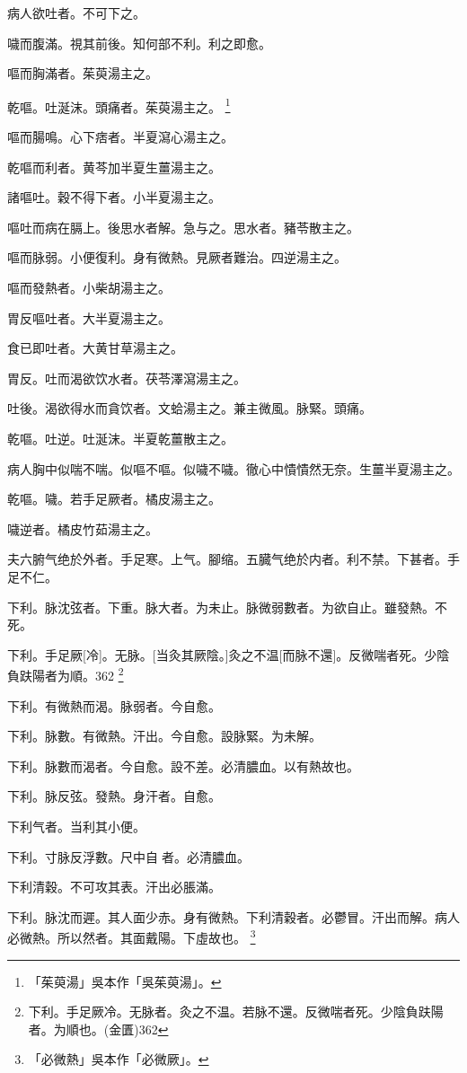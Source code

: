 \documentclass[oneside,b4paper]{ctexbook}
\begin{document}
\begin{flushleft}
病人欲吐者。不可下之。

噦而腹滿。視其前後。知何部不利。利之即愈。

嘔而胸滿者。茱萸湯主之。

乾嘔。吐涎沫。頭痛者。茱萸湯主之。
\footnote{「茱萸湯」吳本作「吳茱萸湯」。}

嘔而腸鳴。心下痞者。半夏瀉心湯主之。

乾嘔而利者。黄芩加半夏生薑湯主之。

諸嘔吐。穀不得下者。小半夏湯主之。

嘔吐而病在膈上。後思水者解。急与之。思水者。豬苓散主之。

嘔而脉弱。小便復利。身有微熱。見厥者難治。四逆湯主之。

嘔而發熱者。小柴胡湯主之。

胃反嘔吐者。大半夏湯主之。

食已即吐者。大黄甘草湯主之。

胃反。吐而渴欲饮水者。茯苓澤瀉湯主之。

吐後。渴欲得水而貪饮者。文蛤湯主之。兼主微風。脉緊。頭痛。

乾嘔。吐逆。吐涎沫。半夏乾薑散主之。

病人胸中似喘不喘。似嘔不嘔。似噦不噦。徹心中憒憒然无奈。生薑半夏湯主之。

乾嘔。噦。若手足厥者。橘皮湯主之。

噦逆者。橘皮竹茹湯主之。

夫六腑气绝於外者。手足寒。上气。腳缩。五臓气绝於内者。利不禁。下甚者。手足不仁。

下利。脉沈弦者。下重。脉大者。为未止。脉微弱數者。为欲自止。雖發熱。不死。

下利。手足厥[冷]。无脉。[当灸其厥陰。]灸之不温[而脉不還]。反微喘者死。少陰負趺陽者为順。362
\footnote{下利。手足厥冷。无脉者。灸之不温。若脉不還。反微喘者死。少陰負趺陽者。为順也。(金匱)362}

下利。有微熱而渴。脉弱者。今自愈。

下利。脉數。有微熱。汗出。今自愈。設脉緊。为未解。

下利。脉數而渴者。今自愈。設不差。必清膿血。以有熱故也。

下利。脉反弦。發熱。身汗者。自愈。

下利气者。当利其小便。

下利。寸脉反浮數。尺中自{𬈧}者。必清膿血。

下利清穀。不可攻其表。汗出必脹滿。

下利。脉沈而遲。其人面少赤。身有微熱。下利清穀者。必鬱冒。汗出而解。病人必微熱。所以然者。其面戴陽。下虛故也。
\footnote{「必微熱」吳本作「必微厥」。}


\end{flushleft}
\end{document}
